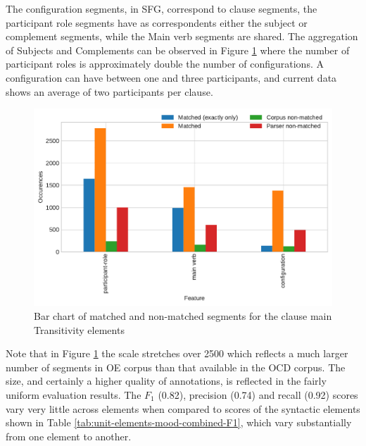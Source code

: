     The configuration segments, in SFG, correspond to clause segments, the participant role segments have as correspondents either the subject or complement segments, while the Main verb segments are shared. The aggregation of Subjects and Complements can be observed in Figure \ref{fig:unit-elements-transitivity-data} where the number of participant roles is approximately double the number of configurations. A configuration can have between one and three participants, and current data shows an average of two participants per clause. 
    
    \begin{figure}[!ht]
    \centering
    \includegraphics[width=.85\textwidth]{evaluation-results/figures/unit-elements-transitivity-data.pdf}
    \caption{Bar chart of matched and non-matched segments for the clause main Transitivity elements}
    \label{fig:unit-elements-transitivity-data}
    \end{figure}
    
    Note that in Figure \ref{fig:unit-elements-transitivity-data} the scale stretches over 2500 which reflects a much larger number of segments in OE corpus than that available in the OCD corpus. The size, and certainly a higher quality of annotations, is reflected in the fairly uniform evaluation results. The $F_1$ (0.82), precision (0.74) and recall (0.92) scores vary very little across elements when compared to scores of the syntactic elements shown in Table \ref{tab:unit-elements-mood-combined-F1},  which vary substantially from one element to another.   

